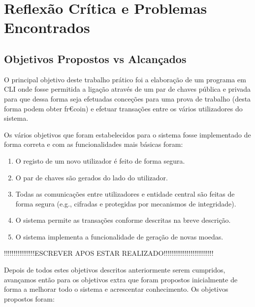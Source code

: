 \chapter{Reflexão Crítica e Problemas Encontrados}
\label{chap:reflexao}

\section{Objetivos Propostos vs Alcançados}
\label{sec:objetivos}
O principal objetivo deste trabalho prático foi a elaboração de um programa em CLI onde fosse permitida a ligação através de um par de chaves pública e privada para que dessa forma seja efetuadas conceções para uma prova de trabalho (desta forma podem obter fr€coin) e efetuar transações entre os vários utilizadores do sistema.


Os vários objetivos que foram estabelecidos para o sistema fosse implementado de forma correta e com as funcionalidades mais básicas foram:
\begin{enumerate}
    
    \item O registo de um novo utilizador é feito de forma segura.
    
    \item O par de chaves são gerados do lado do utilizador.
    
    \item Todas as comunicações entre utilizadores e entidade central são feitas de forma segura (e.g., cifradas e protegidas por mecanismos de integridade).
    
    \item O sistema permite as transações conforme descritas na breve descrição.
    
    \item O sistema implementa a funcionalidade de geração de novas moedas.

\end{enumerate}
    
    
    !!!!!!!!!!!!!!!!ESCREVER APOS ESTAR REALIZADO!!!!!!!!!!!!!!!!!!!!!!!!!!
    
    Depois de todos estes objetivos descritos anteriormente serem cumpridos, avançamos então para os objetivos extra que foram propostos inicialmente de forma a melhorar todo o sistema e acrescentar conhecimento. Os objetivos propostos foram:

